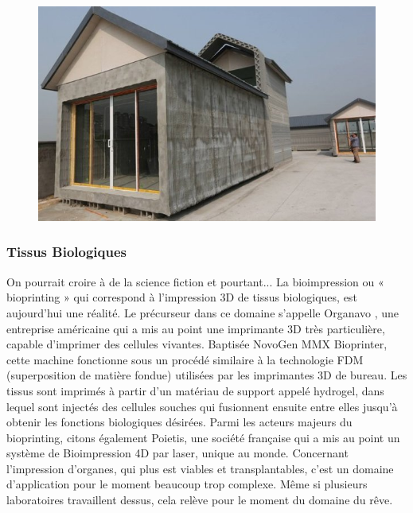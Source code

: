\documentclass{article}
\begin{document}
\begin{figure}[h!]
\centering
\includegraphics[scale=0.4]{./images/maison.png}
\end{figure}\hfill
\newpage

\subsubsection{Tissus Biologiques}

On pourrait croire à de la science fiction et pourtant... La bioimpression ou « bioprinting » qui correspond à l'impression 3D de tissus biologiques, est aujourd'hui une réalité. Le précurseur dans ce domaine s'appelle Organavo , une entreprise américaine qui a mis au point une imprimante 3D très particulière, capable d'imprimer des cellules vivantes. Baptisée NovoGen MMX Bioprinter, cette machine fonctionne sous un procédé similaire à la technologie FDM (superposition de matière fondue) utilisées par les imprimantes 3D de bureau. Les tissus sont imprimés à partir d'un matériau de support appelé hydrogel, dans lequel sont injectés des cellules souches qui fusionnent ensuite entre elles jusqu'à obtenir les fonctions biologiques désirées. Parmi les acteurs majeurs du bioprinting, citons également Poietis, une société française qui a mis au point un système de Bioimpression 4D par laser, unique au monde. Concernant l'impression d'organes, qui plus est viables et transplantables, c'est un domaine d'application pour le moment beaucoup trop complexe. Même si plusieurs laboratoires
travaillent dessus, cela relève pour le moment du domaine du rêve.
\end{document}
